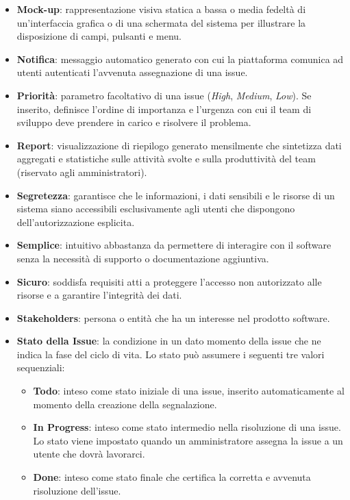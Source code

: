 \documentclass[a4paper,12pt]{article}
\begin{document}
\begin{itemize}
    \item \textbf{Mock-up}: rappresentazione visiva statica a bassa o media fedeltà di un'interfaccia grafica o di una schermata del sistema per illustrare la disposizione di campi, pulsanti e menu.

    \item \textbf{Notifica}: messaggio automatico generato con cui la piattaforma comunica ad utenti autenticati l'avvenuta assegnazione di una issue.

    \item \textbf{Priorità}: parametro facoltativo di una issue (\textit{High}, \textit{Medium}, \textit{Low}). Se inserito, definisce l'ordine di importanza e l'urgenza con cui il team di sviluppo deve prendere in carico e risolvere il problema. 

    \item \textbf{Report}: visualizzazione di riepilogo generato mensilmente che sintetizza dati aggregati e statistiche sulle attività svolte e sulla produttività del team (riservato agli amministratori).

    \item \textbf{Segretezza}: garantisce che le informazioni, i dati sensibili e le risorse di un sistema siano accessibili esclusivamente agli utenti che dispongono dell'autorizzazione esplicita.

    \item \textbf{Semplice}: intuitivo abbastanza da permettere di interagire con il software senza la necessità di supporto o documentazione aggiuntiva.

    \item \textbf{Sicuro}: soddisfa requisiti atti a proteggere l'accesso non autorizzato alle risorse e a garantire l'integrità dei dati.

    \item \textbf{Stakeholders}: persona o entità che ha un interesse nel prodotto software.

    \item \textbf{Stato della Issue}: la condizione in un dato momento della issue che ne indica la fase del ciclo di vita. Lo stato può assumere i seguenti tre valori sequenziali:
    \begin{itemize}
        \item \textbf{Todo}: inteso come stato iniziale di una issue, inserito automaticamente al momento della creazione della segnalazione.
        \item \textbf{In Progress}: inteso come stato intermedio nella risoluzione di una issue. Lo stato viene impostato quando un amministratore assegna la issue a un utente che dovrà lavorarci.
        \item \textbf{Done}: inteso come stato finale che certifica la corretta e avvenuta risoluzione dell'issue.
    \end{itemize}


\end{itemize}
\end{document}
